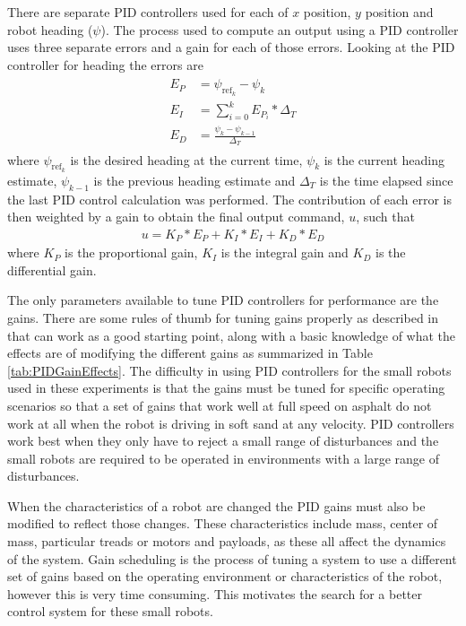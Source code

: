 There are separate PID controllers used for each of $x$ position, $y$ position and robot heading ($\psi$). The process used to compute an output using a PID controller uses three separate errors and a gain for each of those errors. Looking at the PID controller for heading the errors are
\begin{align*}
\begin{split}
E_P &= \psi_{\text{ref}_k} - \psi_k \\
E_I &= \sum_{i=0}^{k}E_{P_i}*\Delta_T \\
E_D &= \frac{\psi_k - \psi_{k-1}}{\Delta_T}
\end{split}
\end{align*}
where $\psi_{\text{ref}_k}$ is the desired heading at the current time, $\psi_k$ is the current heading estimate, $\psi_{k-1}$ is the previous heading estimate and $\Delta_T$ is the time elapsed since the last PID control calculation was performed. The contribution of each error is then weighted by a gain to obtain the final output command, $u$, such that
\begin{align*}
u = K_P*E_P + K_I*E_I + K_D*E_D
\end{align*}
where $K_P$ is the proportional gain, $K_I$ is the integral gain and $K_D$ is the differential gain.

The only parameters available to tune PID controllers for performance are the gains. There are some rules of thumb for tuning gains properly as described in \cite{ZeiglerNichols42} that can work as a good starting point, along with a basic knowledge of what the effects are of modifying the different gains as summarized in Table \ref{tab:PIDGainEffects}. The difficulty in using PID controllers for the small robots used in these experiments is that the gains must be tuned for specific operating scenarios so that a set of gains that work well at full speed on asphalt do not work at all when the robot is driving in soft sand at any velocity. PID controllers work best when they only have to reject a small range of disturbances and the small robots are required to be operated in environments with a large range of disturbances.

When the characteristics of a robot are changed the PID gains must also be modified to reflect those changes. These characteristics include mass, center of mass, particular treads or motors and payloads, as these all affect the dynamics of the system. Gain scheduling is the process of tuning a system to use a different set of gains based on the operating environment or characteristics of the robot, however this is very time consuming. This motivates the search for a better control system for these small robots.

